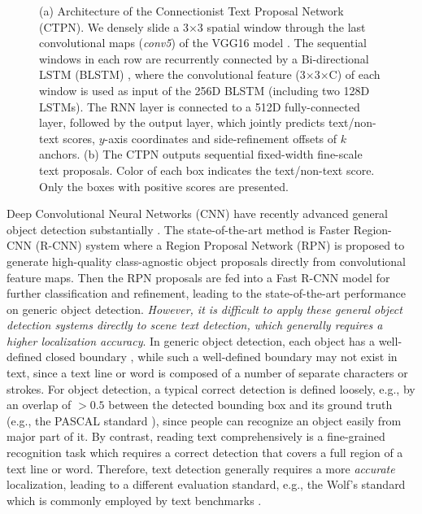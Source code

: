 \documentclass[runningheads]{llncs}
\begin{document}
 \begin{figure}[tb]
\centering
{}
\caption{(a) Architecture of the Connectionist Text Proposal Network (CTPN). We densely slide a 3$\times$3 spatial window through the last convolutional maps (\textit{conv5}) of the VGG16 model \cite{Simonyan2015}. The sequential windows in each row are recurrently connected by a Bi-directional LSTM (BLSTM) \cite{Graves2005}, where the  convolutional feature (3$\times$3$\times$C) of each window is used as input of the 256D BLSTM (including two 128D LSTMs). The RNN layer is connected to a 512D fully-connected layer, followed by the output layer, which jointly predicts text/non-text scores, $y$-axis coordinates  and side-refinement offsets of $k$ anchors. (b) The CTPN outputs sequential fixed-width fine-scale text proposals.  Color of  each box indicates the text/non-text score. Only the boxes with positive scores are presented.}
\label{fig:main}
\end{figure}



Deep Convolutional Neural Networks (CNN) have recently advanced general object detection substantially \cite{Ren2015,Girshick2015,Girshick2014}. 
The state-of-the-art method is Faster Region-CNN (R-CNN) system \cite{Ren2015} where a Region Proposal Network (RPN) is proposed to  generate  high-quality class-agnostic object proposals directly from convolutional feature maps. Then the RPN proposals are fed into a Fast R-CNN \cite{Girshick2015} model for further classification and refinement, leading to the  state-of-the-art performance on generic object detection.
\textit{However, it is difficult to apply these general object detection systems directly to scene text detection, which generally requires a higher localization accuracy}.  
In generic object detection, each object has a well-defined closed boundary \cite{Cheng2014}, while such a well-defined boundary may not exist in text, since a text line or word is composed of a number of separate characters or strokes. For object detection, a typical correct detection is defined loosely, e.g., by an  overlap  of $>0.5$ between the detected bounding box and its ground truth (e.g., the PASCAL standard \cite{Everingham2010}), since people can recognize an object easily from major part of it.
By contrast, reading text comprehensively is a fine-grained recognition task which requires a correct detection that covers a full region of a text line or word. Therefore, text detection generally requires a more \textit{accurate} localization, leading to a different evaluation standard, e.g., the Wolf's standard \cite{Wolf2006} which is commonly employed by text  benchmarks \cite{Karatzas2013,Minetto2010}.   
\end{document}
